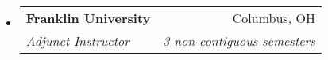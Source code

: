 \documentclass[letterpaper,11pt]{article}
\makeatletter
\newcommand{\resitem}[1]{\item #1 \vspace{-2pt}}
\newcommand{\ressubheading}[4]{
\begin{tabular*}{6.5in}{l@{\cftdotfill{\cftsecdotsep}\extracolsep{\fill}}r}
		\textbf{#1} & #2 \\
		\textit{#3} & \textit{#4} \\
\end{tabular*}\vspace{-6pt}}
\makeatother
\begin{document}
\begin{itemize}
\item
	\ressubheading{Franklin University}{Columbus, OH}{Adjunct Instructor}{3 non-contiguous semesters}
\end{itemize}
\end{document}
